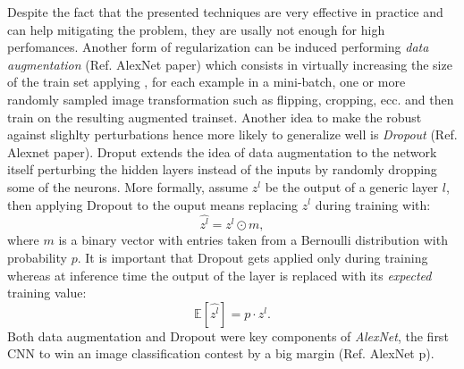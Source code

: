 \documentclass[LaM,binding=0.6cm]{./packages/sapthesis/sapthesis}
\begin{document}
        Despite the fact that the presented techniques are very effective in practice and can help mitigating the problem, they are usally not enough for high perfomances.
        Another form of regularization can be induced performing \textit{data augmentation} (Ref. AlexNet paper) which consists in virtually increasing the size of the train set applying
        , for each example in a mini-batch, one or more randomly sampled image transformation such as flipping, cropping, ecc. and then train on the resulting augmented
        trainset. Another idea to make the robust against slighlty perturbations hence more likely to generalize well is \textit{Dropout} (Ref. Alexnet paper).
        Droput extends the idea of data augmentation to the network itself perturbing the hidden layers instead of the inputs by randomly dropping some of the
        neurons. More formally, assume $z^l$ be the output of a generic layer $l$, then applying Dropout to the ouput means replacing $z^l$ during
        training with:
        \begin{equation}
            \hat{z^l} = z^l \odot m,
        \end{equation}
        where $m$ is a binary vector with entries taken from a Bernoulli distribution with probability $p$. It is important that Dropout gets applied only
        during training whereas at inference time the output of the layer is replaced with its \textit{expected} training value:
        \begin{equation}
            \mathbb{E}[\hat{z^l}] = p \cdot z^l. 
        \end{equation}
        Both data augmentation and Dropout were key components of \textit{AlexNet}, the first CNN to win an image classification
        contest by a big margin (Ref. AlexNet p).
\end{document}

